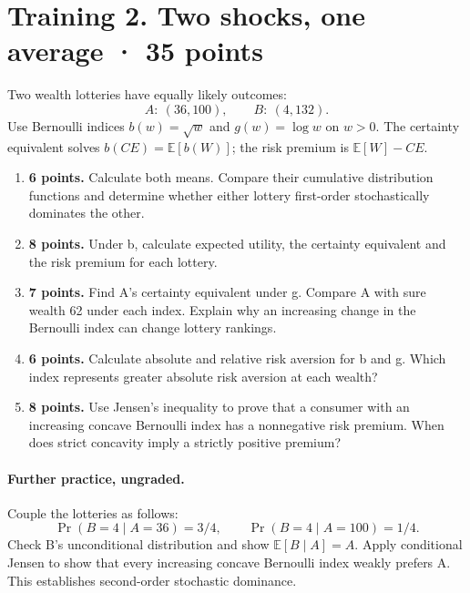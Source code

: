 \section*{Training 2. Two shocks, one average · 35 points}
Two wealth lotteries have equally likely outcomes:
\[
 A:\ (36,100),\qquad B:\ (4,132).
\]
Use Bernoulli indices $b(w)=\sqrt w$ and $g(w)=\log w$ on $w>0$.
The certainty equivalent solves $b(CE)=\mathbb E[b(W)]$; the risk premium
is $\mathbb E[W]-CE$.
\begin{enumerate}[label=(\alph*)]
\item \textbf{6 points.} Calculate both means. Compare their cumulative
distribution functions and determine whether either lottery first-order
stochastically dominates the other.
\item \textbf{8 points.} Under b, calculate expected utility, the certainty
equivalent and the risk premium for each lottery.
\item \textbf{7 points.} Find A's certainty equivalent under g. Compare A
with sure wealth 62 under each index. Explain why an increasing change in
the Bernoulli index can change lottery rankings.
\item \textbf{6 points.} Calculate absolute and relative risk aversion for
b and g. Which index represents greater absolute risk aversion at each wealth?
\item \textbf{8 points.} Use Jensen's inequality to prove that a consumer
with an increasing concave Bernoulli index has a nonnegative risk premium.
When does strict concavity imply a strictly positive premium?
\end{enumerate}
\paragraph{Further practice, ungraded.} Couple the lotteries as follows:
\[
 \Pr(B=4\mid A=36)=3/4,\qquad \Pr(B=4\mid A=100)=1/4.
\]
Check B's unconditional distribution and show $\mathbb E[B\mid A]=A$.
Apply conditional Jensen to show that every increasing concave Bernoulli
index weakly prefers A. This establishes second-order stochastic dominance.

\clearpage
